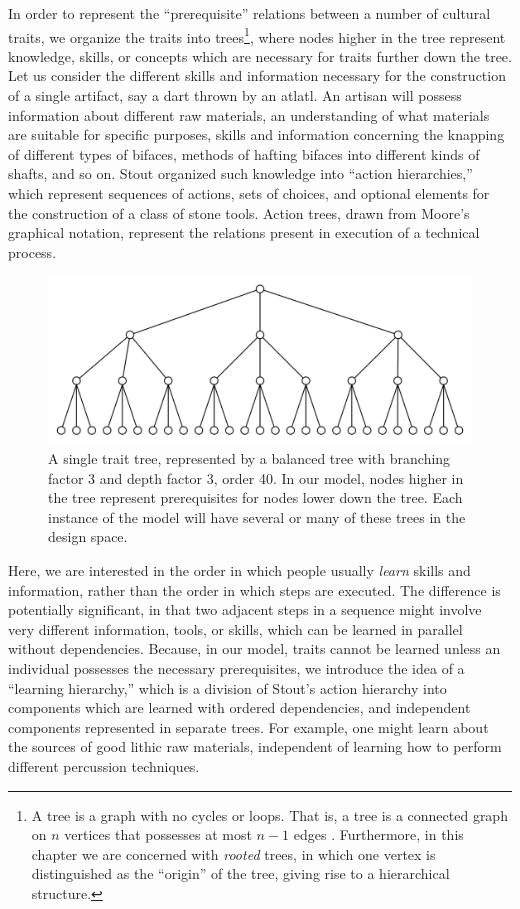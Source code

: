 \documentclass[graybox,natbib]{svmult}
\begin{document}
In order to represent the ``prerequisite'' relations between a number of
cultural traits, we organize the traits into trees\footnote{A tree is a
  graph with no cycles or loops. That is, a tree is a connected graph on
  $n$ vertices that possesses at most $n-1$ edges
  \citep{diestel2010graph}. Furthermore, in this chapter we are
  concerned with \emph{rooted} trees, in which one vertex is
  distinguished as the ``origin'' of the tree, giving rise to a
  hierarchical structure.}, where nodes higher in the tree represent
knowledge, skills, or concepts which are necessary for traits further
down the tree. Let us consider the different skills and information
necessary for the construction of a single artifact, say a dart thrown
by an atlatl. An artisan will possess information about different raw
materials, an understanding of what materials are suitable for specific
purposes, skills and information concerning the knapping of different
types of bifaces, methods of hafting bifaces into different kinds of
shafts, and so on. Stout \citeyearpar{stout2011stone} organized such
knowledge into ``action hierarchies,'' which represent sequences of
actions, sets of choices, and optional elements for the construction of
a class of stone tools. Action trees, drawn from Moore's
\citeyearpar{moore2010grammars} graphical notation, represent the
relations present in execution of a technical process.

\begin{figure}[h] 
\centering 
\includegraphics[]{balanced-trait-tree-3-3.png} 
\caption{A single trait tree, represented by a balanced tree with branching factor 3 and depth factor 3, order 40.  In our model, nodes higher in the tree represent prerequisites for nodes lower down the tree.  Each instance of the model will have several or many of these trees in the design space.} 
\label{img:trait-tree} 
\end{figure}

Here, we are interested in the order in which people usually
\emph{learn} skills and information, rather than the order in which
steps are executed. The difference is potentially significant, in that
two adjacent steps in a sequence might involve very different
information, tools, or skills, which can be learned in parallel without
dependencies. Because, in our model, traits cannot be learned unless an
individual possesses the necessary prerequisites, we introduce the idea
of a ``learning hierarchy,'' which is a division of Stout's action
hierarchy into components which are learned with ordered dependencies,
and independent components represented in separate trees. For example,
one might learn about the sources of good lithic raw materials,
independent of learning how to perform different percussion techniques.
\end{document}
